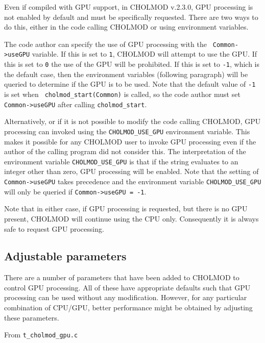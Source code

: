 \documentclass[11pt]{article}
\begin{document}
Even if compiled with GPU support, in CHOLMOD v.2.3.0, GPU processing is not
enabled by default and must be specifically requested.  There are two ways to
do this, either in the code calling CHOLMOD or using environment variables.

The code author can specify the use of GPU processing with the {\tt
Common->useGPU} variable.  If this is set to {\tt 1}, CHOLMOD will attempt to
use the GPU.  If this is set to {\tt 0} the use of the GPU will be prohibited.
If this is set to {\tt -1}, which is the default case, then the environment
variables (following paragraph) will be queried to determine if the GPU is to
be used.  Note that the default value of {\tt -1} is set when {\tt
cholmod\_start(Common)} is called, so the code author must set {\tt
Common->useGPU} after calling {\tt cholmod\_start}.

Alternatively, or if it is not possible to modify the code calling CHOLMOD, GPU
processing can invoked using the {\tt CHOLMOD\_USE\_GPU} environment variable.
This makes it possible for any CHOLMOD user to invoke GPU processing even if
the author of the calling program did not consider this.  The interpretation of
the environment variable {\tt CHOLMOD\_USE\_GPU} is that if the string
evaluates to an integer other than zero, GPU processing will be enabled.  Note
that the setting of {\tt Common->useGPU} takes precedence and the environment
variable {\tt CHOLMOD\_USE\_GPU} will only be queried if {\tt Common->useGPU =
-1}.

Note that in either case, if GPU processing is requested, but there is no GPU
present, CHOLMOD will continue using the CPU only.  Consequently it is always
safe to request GPU processing.

\subsection{Adjustable parameters}

There are a number of parameters that have been added to CHOLMOD to control GPU
processing.  All of these have appropriate defaults such that GPU processing
can be used without any modification.  However, for any particular combination
of CPU/GPU, better performance might be obtained by adjusting these parameters.

\bigskip

From {\tt t\_cholmod\_gpu.c}
\end{document}
